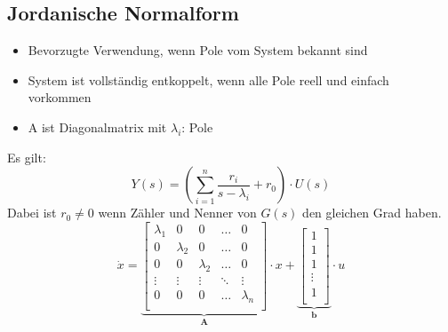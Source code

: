 



\subsection{Jordanische Normalform}
\begin{itemize}
      \item Bevorzugte Verwendung, wenn Pole vom System bekannt sind
      \item System ist vollständig entkoppelt, wenn alle Pole reell und einfach vorkommen
      \item A ist Diagonalmatrix mit $\lambda_i$: Pole
\end{itemize}
Es gilt:
\[
	Y(s) = \left( \sum_{i=1}^{n} \frac{r_i}{s-\lambda_i} + r_0 \right) \cdot U(s)
\]
Dabei ist $r_0 \neq 0$ wenn Zähler und Nenner von $G(s)$ den gleichen Grad haben.
\[
	\dot x=
	\underbrace{
		\begin{bmatrix}
			\lambda_1 &	0 & 0 & \ldots & 0\\
			0 & \lambda_2 & 0 & \ldots & 0\\
			0 & 0 & \lambda_2 & \ldots & 0\\
			\vdots & \vdots & \vdots & \ddots & \vdots \\
			0 & 0 & 0 & \ldots & \lambda_n\\	
		\end{bmatrix}
	}_{\textbf{A}}
	\cdot x +
	\underbrace{
		\begin{bmatrix}
			1 \\
			1 \\
			1 \\
			\vdots \\
			1\\	
		\end{bmatrix}
	}_{\textbf{b}}
	\cdot u	
\]

